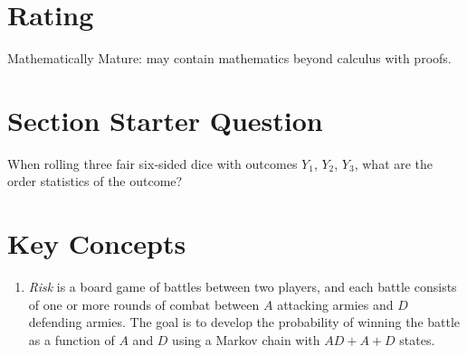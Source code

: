 \documentclass[12pt]{article}
\begin{document}
\myheader \mytitle

\hr


\hr

\usefirefox

\hr



\section*{Rating} %
Mathematically Mature:  may contain mathematics beyond calculus with
proofs.  %

\hr

\section*{Section Starter Question}

When rolling three fair six-sided dice with outcomes \( Y_1 \), \( Y_2 \),
\( Y_3 \), what are the order statistics of the outcome?

\hr

\section*{Key Concepts}

\begin{enumerate}
    \item
        \emph{Risk} is a board game of battles between two players, and
        each battle consists of one or more rounds of combat between \(
        A \) attacking armies and \( D \) defending armies.  The goal is
        to develop the probability of winning the battle as a function
        of \( A \) and \( D \) using a Markov chain with \( AD + A + D \)
        states.
\end{enumerate}
\end{document}
